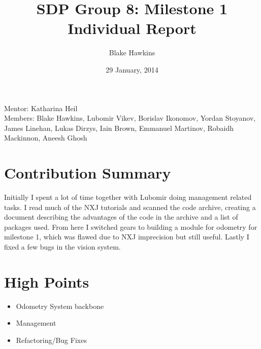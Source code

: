 \documentclass[a4paper,12pt]{article}
\title{SDP Group 8: Milestone 1 Individual Report} %
\author{Blake Hawkins} %
\date{29 January, 2014} %
\begin{document}
\maketitle %

\begin{center}
Mentor: Katharina Heil %
\\
Members: Blake Hawkins, %
Lubomir Vikev,
Borislav Ikonomov,
Yordan Stoyanov,
James Linehan,
Lukas Dirzys,
Iain Brown,
Emmanuel Martinov,
Robaidh Mackinnon,
Aneesh Ghosh

\end{center}


\section{Contribution Summary}

Initially I spent a lot of time together with Lubomir doing management related tasks. I read much of the NXJ tutorials and scanned the code archive, creating a document describing the advantages of the code in the archive and a list of packages used. From here I switched gears to building a module for odometry for milestone 1, which was flawed due to NXJ imprecision but still useful. Lastly I fixed a few bugs in the vision system.
 

\section{High Points}

\begin{itemize}
\item Odometry System backbone
\item Management
\item Refactoring/Bug Fixes
\end{itemize}

\end{document}
